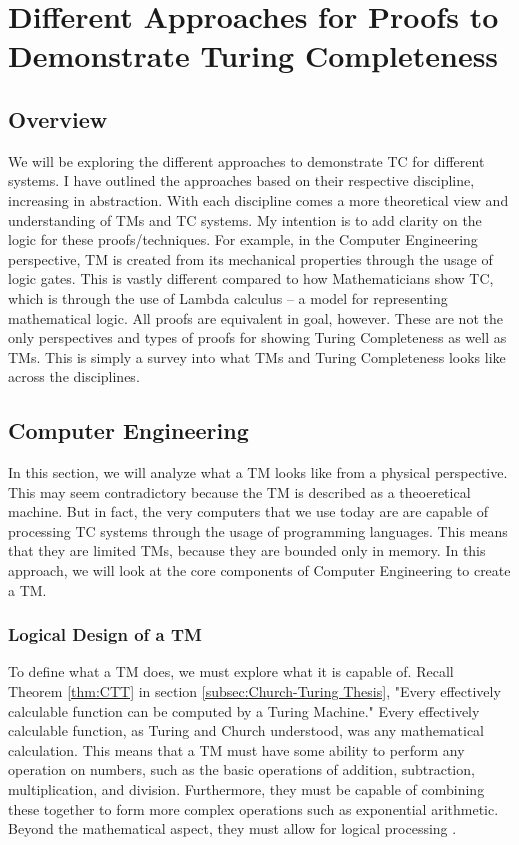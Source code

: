 \chapter{Different Approaches for Proofs to Demonstrate Turing Completeness}\label{chapter:ProofApproachesForTC}

\section{Overview}\label{sec:ProofOverview}

We will be exploring the different approaches to demonstrate TC for different systems.
I have outlined the approaches based on their respective discipline, increasing in abstraction.
With each discipline comes a more theoretical view and understanding of TMs and TC systems.
My intention is to add clarity on the logic for these proofs/techniques.
For example, in the Computer Engineering perspective, TM is created from its mechanical properties through the usage of logic gates.
This is vastly different compared to how Mathematicians show TC, which is through the use of Lambda calculus -- a model for representing mathematical logic.
All proofs are equivalent in goal, however.
These are not the only perspectives and types of proofs for showing Turing Completeness as well as TMs.
This is simply a survey into what TMs and Turing Completeness looks like across the disciplines.

\section{Computer Engineering}\label{sec:CE}

In this section, we will analyze what a TM looks like from a physical perspective.
This may seem contradictory because the TM is described as a theoeretical machine.
But in fact, the very computers that we use today are are capable of processing TC systems through the usage of programming languages.
This means that they are limited TMs, because they are bounded only in memory.
In this approach, we will look at the core components of Computer Engineering to create a TM.

\subsection{Logical Design of a TM}\label{subsec:TMLogicalDesign}

To define what a TM does, we must explore what it is capable of.
Recall Theorem \ref{thm:CTT} in section \ref{subsec:Church-Turing Thesis}, "Every effectively calculable function can be computed by a Turing Machine."
Every effectively calculable function, as Turing and Church understood, was any mathematical calculation.
This means that a TM must have some ability to perform any operation on numbers, such as the basic operations of addition, subtraction, multiplication, and division.
Furthermore, they must be capable of combining these together to form more complex operations such as exponential arithmetic.
Beyond the mathematical aspect, they must allow for logical processing \cite{ChemTM}.


